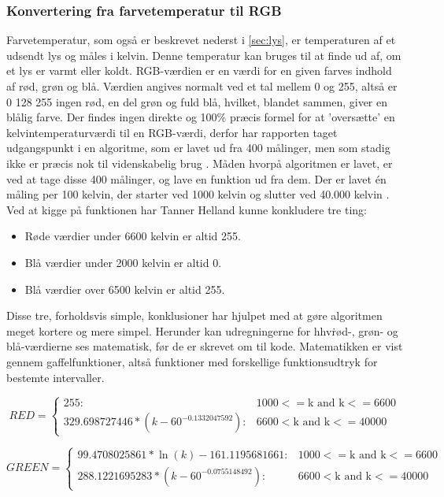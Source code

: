 \subsubsection{Konvertering fra farvetemperatur til RGB}
\label{sec:temptilrgb}
Farvetemperatur, som også er beskrevet nederst i \ref{sec:lys}, er temperaturen af et udsendt lys og måles i kelvin. Denne temperatur kan bruges til at finde ud af, om et lys er varmt eller koldt. 
RGB-værdien er en værdi for en given farves indhold af rød, grøn og blå. Værdien angives normalt ved et tal mellem 0 og 255, altså er 0 128 255 ingen rød, en del grøn og fuld blå, hvilket, blandet sammen, giver en blålig farve.
Der findes ingen direkte og 100\% præcis formel for at ’oversætte’ en kelvintemperaturværdi til en RGB-værdi, derfor har rapporten taget udgangspunkt i en algoritme, som er lavet ud fra 400 målinger, men som stadig ikke er præcis nok til videnskabelig brug \cite{tanner_helland}.
Måden hvorpå algoritmen er lavet, er ved at tage disse 400 målinger, og lave en funktion ud fra dem. Der er lavet én måling per 100 kelvin, der starter ved 1000 kelvin og slutter ved 40.000 kelvin \cite{charity_values}. Ved at kigge på funktionen \cite{tanner_helland_chart} har Tanner Helland kunne konkludere  tre ting:

\begin{itemize}
\item Røde værdier under 6600 kelvin er altid 255.
\item Blå værdier under 2000 kelvin er altid 0.
\item Blå værdier over 6500 kelvin er altid 255.
\end{itemize}

Disse tre, forholdsvis simple, konklusioner har hjulpet med at gøre algoritmen meget kortere og mere simpel. Herunder kan udregningerne for hhv\.  rød-, grøn- og blå-værdierne ses matematisk, før de er skrevet om til kode. Matematikken er vist gennem gaffelfunktioner, altså funktioner med forskellige funktionsudtryk for bestemte intervaller.


\begin{displaymath}
   RED = \left\{
     \begin{array}{lr}
       255: & 1000 <= \text{k and k} <= 6600\\
       329.698727446*(k-60^{-0.1332047592}): & 6600< \text{k and k} <= 40000
     \end{array}
   \right.
\end{displaymath} 

\begin{displaymath}
   GREEN = \left\{
     \begin{array}{lr}
       99.4708025861*\ln(k)-161.1195681661: & 1000 <= \text{k and k} <= 6600\\
       288.1221695283*(k-60^{-0.0755148492}): & 6600< \text{k and k} <= 40000
     \end{array}
   \right.
\end{displaymath} 

